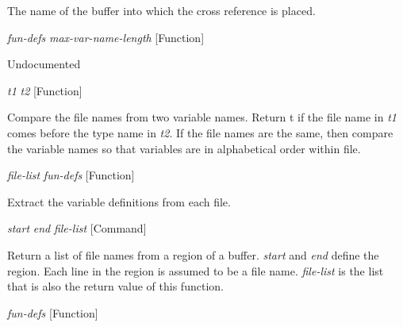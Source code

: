 \begin{doc-string}
The name of the buffer into which the cross reference is placed.
\end{doc-string}

\vspace{1em}
\noindent
{}
\usebox{\funcname}\emph{fun-defs} \emph{max-var-name-length}
 \hfill [Function]
\hspace*{\wd\funcname}

\begin{doc-string}
Undocumented
\end{doc-string}

\vspace{1em}
\noindent
{}
\usebox{\funcname}\emph{t1} \emph{t2}
 \hfill [Function]

\begin{doc-string}
Compare the file names from two variable names.  Return t if the file
name in \emph{t1} comes before the type name in \emph{t2}.  If the file names are the same,
then compare the variable names so that variables are in alphabetical order
within file.
\end{doc-string}

\vspace{1em}
\noindent
{}
\usebox{\funcname}\emph{file-list} \emph{fun-defs}
 \hfill [Function]

\begin{doc-string}
Extract the variable definitions from each file.
\end{doc-string}

\vspace{1em}
\noindent
{}
\usebox{\funcname}\emph{start} \emph{end} \emph{file-list}
 \hfill [Command]

\begin{doc-string}
Return a list of file names from a region of a buffer.  \emph{start} and \emph{end}
define the region.  Each line in the region is assumed to be a file name.
\emph{file-list} is the list that is also the return value of this function.
\end{doc-string}

\vspace{1em}
\noindent
{}
\usebox{\funcname}\emph{fun-defs}
 \hfill [Function]

